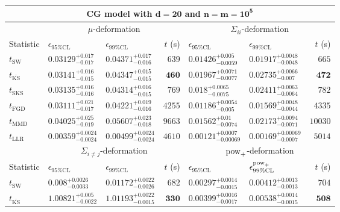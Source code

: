 \begin{tabular}{l|llr|llr}
	\toprule
	\multicolumn{7}{c}{{\bf CG model with $\mathbf{d=20}$ and $\mathbf{n=m=10^{5}}$}} \\
	\toprule
	\multicolumn{1}{c}{} & \multicolumn{3}{c}{$\mu$-deformation} & \multicolumn{3}{c}{$\Sigma_{ii}$-deformation} \\
	Statistic & $\epsilon_{95\%\mathrm{CL}}$ & $\epsilon_{99\%\mathrm    {CL}}$ & $t$ (s) & $\epsilon_{95\%\mathrm{CL}}$ & $\epsilon_{99\%\mathrm{CL}}$ & $t$ (s) \\
	\midrule
	$t_{\mathrm{SW}}$ & $0.03129_{-0.017}^{+0.017}$ & $0.04371_{-0.016}^{+0.017}$ & $639$ & $0.01426_{-0.0059}^{+0.005}$ & $0.01917_{-0.0048}^{+0.0048}$ & $665$ \\
	$t_{\overline{\mathrm{KS}}}$ & $0.03141_{-0.015}^{+0.016}$ & $0.04347_{-0.015}^{+0.015}$ & ${\mathbf{460}}$ & $0.01967_{-0.0077}^{+0.0071}$ & $0.02735_{-0.007}^{+0.0066}$ & ${\mathbf{472}}$ \\
	$t_{\mathrm{SKS}}$ & $0.03135_{-0.016}^{+0.016}$ & $0.04314_{-0.015}^{+0.016}$ & $769$ & $0.018_{-0.0075}^{+0.0065}$ & $0.02411_{-0.0064}^{+0.0063}$ & $782$ \\
	$t_{\mathrm{FGD}}$ & ${\mathbf{0.03111_{-0.017}^{+0.021}}}$ & ${\mathbf{0.04221_{-0.016}^{+0.019}}}$ & $4255$ & ${\mathbf{0.01186_{-0.005}^{+0.0054}}}$ & ${\mathbf{0.01569_{-0.0044}^{+0.0048}}}$ & $4335$ \\
	$t_{\mathrm{MMD}}$ & $0.04025_{-0.019}^{+0.025}$ & $0.05607_{-0.018}^{+0.023}$ & $9663$ & $0.01562_{-0.0074}^{+0.01}$ & $0.02173_{-0.0071}^{+0.0094}$ & $10030$ \\
	$t_{\mathrm{LLR}}$ & $0.00359_{-0.0024}^{+0.0024}$ & $0.00499_{-0.0024}^{+0.0024}$ & $4610$ & $0.00121_{-0.00069}^{+0.0007}$ & $0.00169_{-0.0007}^{+0.00069}$ & $5014$ \\
	\toprule
	\multicolumn{1}{c}{} & \multicolumn{3}{c}{$\Sigma_{i\neq j}$-deformation} & \multicolumn{3}{c}{$\rm{pow}_{+}$-deformation} \\
	Statistic & $\epsilon_{95\%\mathrm{CL}}$ & $\epsilon_{99\%\mathrm{CL}}$ & $t$ (s) & $\epsilon_{95\%\mathrm{CL}}$ & $\epsilon^{\rm   {pow}_{+}}_{99\%\mathrm{CL}}$ & $t$ (s) \\
	\midrule
	$t_{\mathrm{SW}}$ & $0.008_{-0.0033}^{+0.0026}$ & $0.01172_{-0.0026}^{+0.0022}$ & $682$ & $0.00297_{-0.0015}^{+0.0014}$ & $0.00412_{-0.0013}^{+0.0013}$ & $704$ \\
	$t_{\overline{\mathrm{KS}}}$ & $1.00821_{-0.0022}^{+0.005}$ & $1.01193_{-0.0015}^{+0.0022}$ & ${\mathbf{330}}$ & $0.00399_{-0.0017}^{+0.0016}$ & $0.00538_{-0.0015}^{+0.0014}$ & ${\mathbf{508}}$ \\

\end{tabular}
